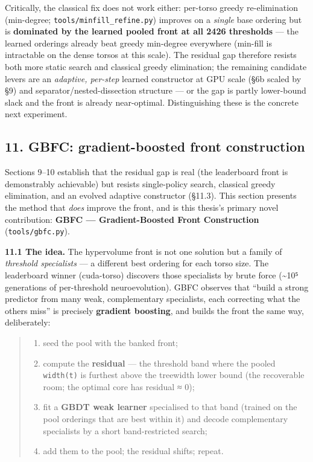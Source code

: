 \documentclass[
  11pt,
]{article}
\providecommand{\tightlist}{%
  \setlength{\itemsep}{0pt}\setlength{\parskip}{0pt}}
\begin{document}
Critically, the classical fix does not work either: per-torso greedy
re-elimination (min-degree; \texttt{tools/minfill\_refine.py}) improves
on a \emph{single} base ordering but is \textbf{dominated by the learned
pooled front at all 2426 thresholds} --- the learned orderings already
beat greedy min-degree everywhere (min-fill is intractable on the dense
torsos at this scale). The residual gap therefore resists both more
static search and classical greedy elimination; the remaining candidate
levers are an \emph{adaptive, per-step} learned constructor at GPU scale
(§6b scaled by §9) and separator/nested-dissection structure --- or the
gap is partly lower-bound slack and the front is already near-optimal.
Distinguishing these is the concrete next experiment.

\hypertarget{gbfc-gradient-boosted-front-construction}{%
\subsection{11. GBFC: gradient-boosted front
construction}\label{gbfc-gradient-boosted-front-construction}}

Sections 9--10 establish that the residual gap is real (the leaderboard
front is demonstrably achievable) but resists single-policy search,
classical greedy elimination, and an evolved adaptive constructor
(§11.3). This section presents the method that \emph{does} improve the
front, and is this thesis's primary novel contribution: \textbf{GBFC ---
Gradient-Boosted Front Construction} (\texttt{tools/gbfc.py}).

\textbf{11.1 The idea.} The hypervolume front is not one solution but a
family of \emph{threshold specialists} --- a different best ordering for
each torso size. The leaderboard winner (cuda-torso) discovers those
specialists by brute force (\textasciitilde10⁵ generations of
per-threshold neuroevolution). GBFC observes that ``build a strong
predictor from many weak, complementary specialists, each correcting
what the others miss'' is precisely \textbf{gradient boosting}, and
builds the front the same way, deliberately:

\begin{quote}
\begin{enumerate}
\def\labelenumi{\arabic{enumi}.}
\tightlist
\item
  seed the pool with the banked front;
\item
  compute the \textbf{residual} --- the threshold band where the pooled
  \texttt{width(t)} is furthest above the treewidth lower bound (the
  recoverable room; the optimal core has residual ≈ 0);
\item
  fit a \textbf{GBDT weak learner} specialised to that band (trained on
  the pool orderings that are best within it) and decode complementary
  specialists by a short band-restricted search;
\item
  add them to the pool; the residual shifts; repeat.
\end{enumerate}
\end{quote}
\end{document}
